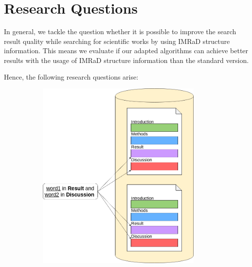 
\section{Research Questions}
\label{sec:research_questions}

In general, we tackle the question whether it is possible to improve the search result quality while searching for scientific works by using IMRaD structure information. This means we evaluate if our adapted algorithms can achieve better results with the usage of IMRaD structure information than the standard version.

Hence, the following research questions arise:

\begin{figure}[t]
  \begin{subfigure}[c]{0.49\textwidth}
    \includegraphics[width=0.9\textwidth]{figures/explicit}
  \end{subfigure}
  \begin{subfigure}[c]{0.49\textwidth}

\end{subfigure}
\end{figure}

